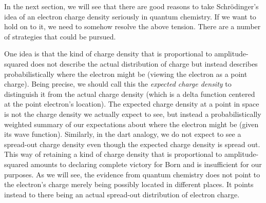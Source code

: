 \documentclass[12pt,onecolumn,secnumarabic,amsmath,amssymb,balancelastpage,nofootinbib]{article}
\begin{document}
In the next section, we will see that there are good reasons to take Schr\"{o}dinger's idea of an electron charge density seriously in quantum chemistry.  If we want to hold on to it, we need to somehow resolve the above tension.  There are a number of strategies that could be pursued.

One idea is that the kind of charge density that is proportional to amplitude-squared does not describe the actual distribution of charge but instead describes probabilistically where the electron might be (viewing the electron as a point charge).  Being precise, we should call this the \emph{expected charge density} to distinguish it from the actual charge density (which is a delta function centered at the point electron's location).  The expected charge density at a point in space is not the charge density we actually expect to see, but instead a probabilistically weighted summary of our expectations about where the electron might be (given its wave function).  Similarly, in the dart analogy, we do not expect to see a spread-out charge density even though the expected charge density is spread out.  This way of retaining a kind of charge density that is proportional to amplitude-squared amounts to declaring complete victory for Born and is insufficient for our purposes.  As we will see, the evidence from quantum chemistry does not point to the electron's charge merely being possibly located in different places.  It points instead to there being an actual spread-out distribution of electron charge.
\end{document}
